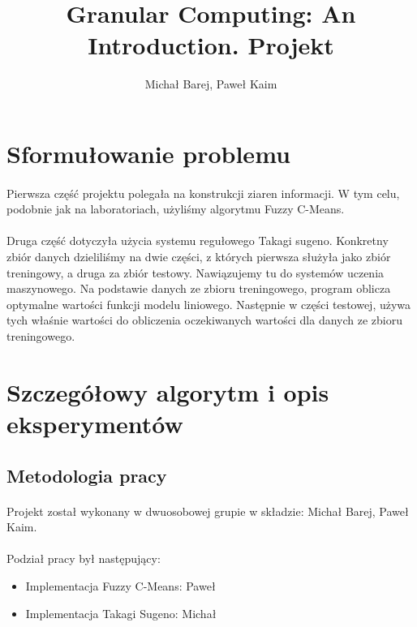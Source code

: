 \documentclass[10pt,a4paper]{article}
\author{Michał Barej, Paweł Kaim}
\begin{document}
\title{\textbf{Granular Computing: An Introduction. Projekt}}
\maketitle

\section{Sformułowanie problemu}
\paragraph{}
Pierwsza część projektu polegała na konstrukcji ziaren informacji. W tym celu, podobnie jak na laboratoriach, użyliśmy algorytmu Fuzzy C-Means.
\paragraph{}
Druga część dotyczyła użycia systemu regułowego Takagi sugeno. Konkretny zbiór danych dzieliliśmy na dwie części, z których pierwsza służyła jako zbiór treningowy, a druga za zbiór testowy. Nawiązujemy tu do systemów uczenia maszynowego. Na podstawie danych ze zbioru treningowego, program oblicza optymalne wartości funkcji modelu liniowego. Następnie w części testowej, używa tych właśnie wartości do obliczenia oczekiwanych wartości dla danych ze zbioru treningowego.

\section{Szczegółowy algorytm i opis eksperymentów}
\subsection{Metodologia pracy}
\paragraph{}
Projekt został wykonany w dwuosobowej grupie w składzie: Michał Barej, Paweł Kaim.
\paragraph{}
Podział pracy był następujący:
\begin{itemize}
\item Implementacja Fuzzy C-Means: Paweł
\item Implementacja Takagi Sugeno: Michał
\end{itemize}
\end{document}

